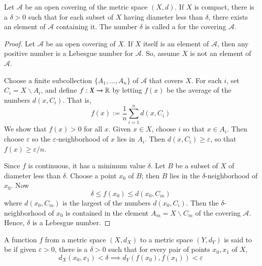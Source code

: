 \documentclass[12pt, a4paper, oneside, openright, titlepage]{book}
\begin{document}
\begin{lem}
    Let $\mathcal{A}$ be an open covering of the metric space $(X,d)$. If $X$ is compact, there is a $\delta > 0$ such that for each subset of $X$ having diameter less than $\delta$, there exists an element of $\mathcal{A}$ containing it. The number $\delta$ is called a  for the covering $\mathcal{A}$.
\end{lem}
\begin{proof}
    Let $\mathcal{A}$ be an open covering of $X$. If $X$ itself is an element of $\mathcal{A}$, then any positive number is a Lebesgue number for $\mathcal{A}$. So, assume $X$ is not an element of $\mathcal{A}$.

    Choose a finite subcollection $\{A_1,...,A_n\}$ of $\mathcal{A}$ that covers $X$. For each $i$, set $C_i = X\backslash A_i$, and define $f:X\rightarrow \mathbb R$ by letting $f(x)$ be the average of the numbers $d(x,C_i)$. That is, \begin{equation*}
        f(x) := \frac{1}{n}\sum\limits_{i=1}^nd(x,C_i)
    \end{equation*}
    We show that $f(x) > 0$ for all $x$. Given $x \in X$, choose $i$ so that $x \in A_i$. Then choose $\varepsilon$ so the $\varepsilon$-neighborhood of $x$ lies in $A_i$. Then $d(x,C_i)\geq \varepsilon$, so that $f(x) \geq \varepsilon/n$.

    Since $f$ is continuous, it has a minimum value $\delta$. Let $B$ be a subset of $X$ of diameter less than $\delta$. Choose a point $x_0$ of $B$; then $B$ lies in the $\delta$-neighborhood of $x_0$. Now \begin{equation*}
        \delta \leq f(x_0) \leq d(x_0,C_m)
    \end{equation*}
    where $d(x_0,C_m)$ is the largest of the numbers $d(x_0,C_i)$. Then the $\delta$-neighborhood of $x_0$ is contained in the element $A_m = X\backslash C_m$ of the covering $\mathcal{A}$. Hence, $\delta$ is a Lebesgue number.
\end{proof}

\begin{defn}
    A function $f$ from a metric space $(X,d_X)$ to a metric space $(Y,d_Y)$ is said to be  if given $\varepsilon > 0$, there is a $\delta > 0$ such that for every pair of points $x_0,x_1$ of $X$, \begin{equation*}
        d_X(x_0,x_1)<\delta \implies d_Y(f(x_0),f(x_1)) < \varepsilon
    \end{equation*}
\end{defn}
\end{document}
